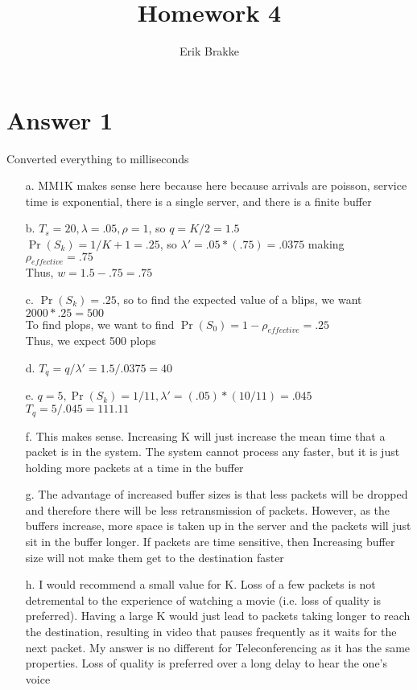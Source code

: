 \documentclass[11pt]{article}
\theoremstyle{definition}
\begin{document}
\title{Homework 4}
\author{Erik Brakke}
\maketitle

\thispagestyle{fancy}
 
 
\section*{Answer 1}
Converted everything to milliseconds
\begin{enumerate}
	\item[a.] MM1K makes sense here because here because arrivals are poisson, service time is exponential, there is a single server, and there is a finite buffer
	
	\item[b.] $T_s = 20, \lambda = .05, \rho = 1$, so $q = K/2 = 1.5$\\
		  $\Pr(S_k) = 1/K+1 = .25$, so $\lambda' = .05*(.75) = .0375$ making $\rho_{effective} = .75$\\
		  Thus, $w = 1.5 - .75 = .75$
	\item[c.] $\Pr(S_k) = .25$, so to find the expected value of a blips, we want $2000 * .25 = 500$\\
		To find plops, we want to find $\Pr(S_0) = 1 - \rho_{effective} = .25$\\
		Thus, we expect 500 plops
	\item[d.] $T_q = q / \lambda' = 1.5 / .0375 = 40$
	\item[e.] $q = 5, \Pr(S_k) = 1/11, \lambda' = (.05)*(10/11) = .045$\\
		  $T_q = 5 / .045 = 111.11$
	\item[f.] This makes sense.  Increasing K will just increase the mean time that a packet is in the system.  The system cannot process any faster, but it is just holding more packets at a time in the buffer
	\item[g.] The advantage of increased buffer sizes is that less packets will be dropped and therefore there will be less retransmission of packets.  However, as the buffers increase, more space is taken up in the server
		  and the packets will just sit in the buffer longer.  If packets are time sensitive, then Increasing buffer size will not make them get to  the destination faster
	\item[h.] I would recommend a small value for K.  Loss of a few packets is not detremental to the experience of watching a movie (i.e. loss of quality is preferred).  Having a large K would just lead to packets taking
		  longer to reach the destination, resulting in video that pauses frequently as it waits for the next packet.  My answer is no different for Teleconferencing as it has the same properties.  Loss of quality is
		  preferred over a long delay to hear the one's voice
\end{enumerate}
\end{document}
